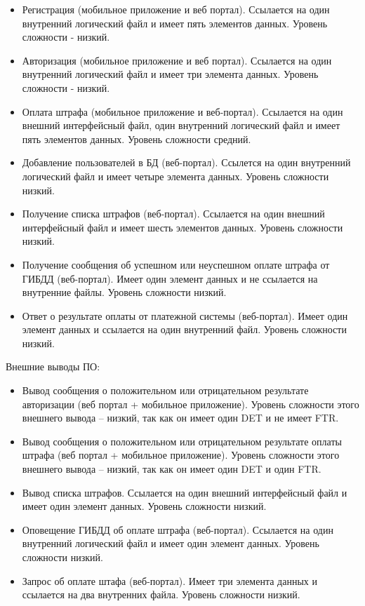 \documentclass[a4paper,14pt]{article}
\begin{document}
\begin{itemize}
    \item Регистрация (мобильное приложение и веб портал). Ссылается на один внутренний логический файл и имеет пять элементов данных. Уровень сложности - низкий.
    \item Авторизация (мобильное приложение и веб портал). Ссылается на один внутренний логический файл и имеет три элемента данных. Уровень сложности - низкий.
    \item Оплата штрафа (мобильное приложение и веб-портал). Ссылается на один внешний интерфейсный файл, один внутренний логический файл и имеет пять элементов данных. Уровень сложности средний.
    \item Добавление пользователей в БД (веб-портал). Ссылется на один внутренний логический файл и имеет четыре элемента данных. Уровень сложности низкий.
    \item Получение списка штрафов (веб-портал). Ссылается на один внешний интерфейсный файл и имеет шесть элементов данных. Уровень сложности низкий.
    \item Получение сообщения об успешном или неуспешном оплате штрафа от ГИБДД (веб-портал). Имеет один элемент данных и не ссылается на внутренние файлы. Уровень сложности низкий.
    \item Ответ о результате оплаты от платежной системы (веб-портал). Имеет один элемент данных и ссылается на один внутренний файл. Уровень сложности низкий.
\end{itemize}

Внешние выводы ПО:

\begin{itemize}
    \item Вывод сообщения о положительном или отрицательном результате авторизации (веб портал + мобильное приложение). Уровень  сложности  этого внешнего вывода – низкий, так как он имеет один DET и не имеет FTR.
    \item Вывод сообщения о положительном или отрицательном результате оплаты штрафа (веб портал + мобильное приложение). Уровень  сложности  этого внешнего вывода – низкий, так как он имеет один DET и один FTR.
    \item Вывод списка штрафов.  Ссылается на один внешний интерфейсный файл и имеет один элемент данных. Уровень сложности низкий.
    \item Оповещение ГИБДД об оплате штрафа (веб-портал). Ссылается на один внутренний логический файл и имеет один элемент данных. Уровень сложности низкий.
    \item Запрос об оплате штафа (веб-портал). Имеет три элемента данных и ссылается на два внутренних файла. Уровень сложности низкий.
\end{itemize}
\end{document}
